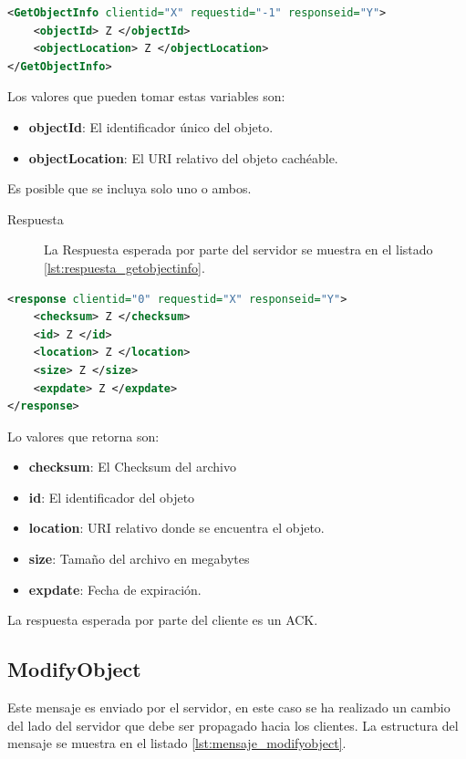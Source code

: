 \begin{lstlisting}[language=XML,caption={Mensaje de GetObjectInfo},label={lst:mensaje_getobjectinfo}]
<GetObjectInfo clientid="X" requestid="-1" responseid="Y"> 
	<objectId> Z </objectId>
	<objectLocation> Z </objectLocation>
</GetObjectInfo>
\end{lstlisting}

Los valores que pueden tomar estas variables son:

\begin{itemize}
\item \textbf{objectId}: El identificador único del objeto.
\item \textbf{objectLocation}: El URI relativo del objeto cachéable.
\end{itemize}

Es posible que se incluya solo uno o ambos.

\begin{description}
\item[Respuesta] La Respuesta esperada por parte del servidor se muestra en el listado \ref{lst:respuesta_getobjectinfo}.
\end{description}

\begin{lstlisting}[language=XML,caption={Mensaje de Respuesta de GetObjectInfo},label={lst:respuesta_getobjectinfo}]
<response clientid="0" requestid="X" responseid="Y"> 
	<checksum> Z </checksum>
	<id> Z </id>
	<location> Z </location>
	<size> Z </size>
	<expdate> Z </expdate>
</response>
\end{lstlisting}

Lo valores que retorna son:

\begin{itemize}
\item \textbf{checksum}:  El Checksum del archivo
\item \textbf{id}: El identificador del objeto
\item \textbf{location}: URI relativo donde se encuentra el objeto.
\item \textbf{size}: Tamaño del archivo en megabytes
\item \textbf{expdate}: Fecha de expiración.
\end{itemize}


La respuesta esperada por parte del cliente es un ACK.

\subsection{ModifyObject}
Este mensaje es enviado por el servidor, en este caso se ha realizado un cambio del lado del servidor que debe ser propagado hacia los clientes. La estructura del mensaje se muestra en el listado \ref{lst:mensaje_modifyobject}.

